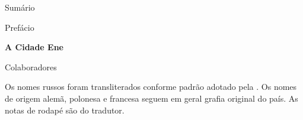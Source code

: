 \thispagestyle{empty}
\MyriadPro
Sumário

\hspace{2cm}{\Georgia{\pageref{prefacio}}} \hspace{.6cm} Prefácio 

\medskip

\hspace{2cm}{\Georgia{\pageref{cidade}}} \hspace{.4cm} \textbf{A Cidade Ene} 

\medskip

\hspace{2cm}{\Georgia{\pageref{colaboradores}}} \hspace{.2cm} Colaboradores

\pagebreak
\thispagestyle{empty}

\begin{vplace}[30]
\begin{centering}
Os nomes russos foram transliterados conforme padrão adotado pela \scalebox{0.8}{USP}.
Os nomes de origem alemã, polonesa e francesa seguem em geral grafia original do país.
As notas de rodapé são do tradutor.
\end{centering}
\end{vplace}
\thispagestyle{empty}